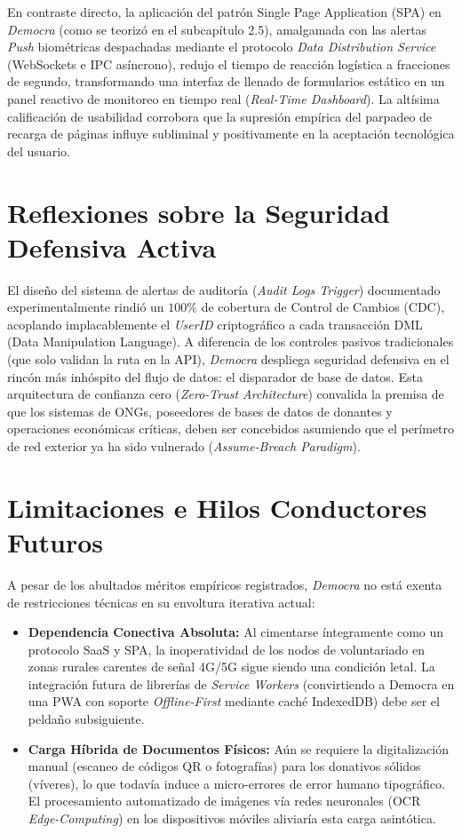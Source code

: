 \documentclass[11pt,a4paper,oneside]{report}
\begin{document}
En contraste directo, la aplicaci\'on del patr\'on Single Page Application (SPA) en \textit{Democra} (como se teoriz\'o en el subcap\'itulo 2.5), amalgamada con las alertas \textit{Push} biom\'etricas despachadas mediante el protocolo \textit{Data Distribution Service} (WebSockets e IPC as\'incrono), redujo el tiempo de reacci\'on log\'istica a fracciones de segundo, transformando una interfaz de llenado de formularios est\'atico en un panel reactivo de monitoreo en tiempo real (\textit{Real-Time Dashboard}). La alt\'isima calificaci\'on de usabilidad corrobora que la supresi\'on emp\'irica del parpadeo de recarga de p\'aginas influye subliminal y positivamente en la aceptaci\'on tecnol\'ogica del usuario.

\section{Reflexiones sobre la Seguridad Defensiva Activa}

El dise\~no del sistema de alertas de auditor\'ia (\textit{Audit Logs Trigger}) documentado experimentalmente rindi\'o un $100\%$ de cobertura de Control de Cambios (CDC), acoplando implacablemente el \textit{UserID} criptogr\'afico a cada transacci\'on DML (Data Manipulation Language). A diferencia de los controles pasivos tradicionales (que solo validan la ruta en la API), \textit{Democra} despliega seguridad defensiva en el rinc\'on m\'as inh\'ospito del flujo de datos: el disparador de base de datos. Esta arquitectura de confianza cero (\textit{Zero-Trust Architecture}) convalida la premisa de que los sistemas de ONGs, poseedores de bases de datos de donantes y operaciones econ\'omicas cr\'iticas, deben ser concebidos asumiendo que el per\'imetro de red exterior ya ha sido vulnerado (\textit{Assume-Breach Paradigm}).

\section{Limitaciones e Hilos Conductores Futuros}

A pesar de los abultados m\'eritos emp\'iricos registrados, \textit{Democra} no est\'a exenta de restricciones t\'ecnicas en su envoltura iterativa actual:
\begin{itemize}
    \item \textbf{Dependencia Conectiva Absoluta:} Al cimentarse \'integramente como un protocolo SaaS y SPA, la inoperatividad de los nodos de voluntariado en zonas rurales carentes de se\~nal 4G/5G sigue siendo una condici\'on letal. La integraci\'on futura de librer\'ias de \textit{Service Workers} (convirtiendo a Democra en una PWA con soporte \textit{Offline-First} mediante cach\'e IndexedDB) debe ser el pelda\~no subsiguiente.
    \item \textbf{Carga H\'ibrida de Documentos F\'isicos:} A\'un se requiere la digitalizaci\'on manual (escaneo de c\'odigos QR o fotograf\'ias) para los donativos s\'olidos (v\'iveres), lo que todav\'ia induce a micro-errores de error humano tipogr\'afico. El procesamiento automatizado de im\'agenes v\'ia redes neuronales (OCR \textit{Edge-Computing}) en los dispositivos m\'oviles aliviar\'ia esta carga asint\'otica.
\end{itemize}
\end{document}
